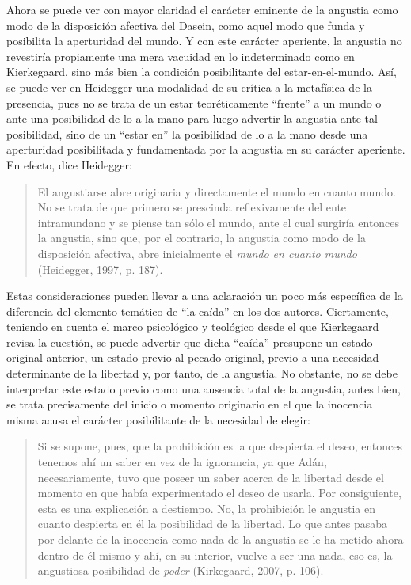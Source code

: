 \begin{refsection}
Ahora se puede ver con mayor claridad el carácter eminente de la angustia como modo de la disposición afectiva del Dasein, como aquel modo que funda y posibilita la aperturidad del mundo. Y con este carácter aperiente, la angustia no revestiría propiamente una mera vacuidad en lo indeterminado como en Kierkegaard, sino más bien la condición posibilitante del estar-en-el-mundo. Así, se puede ver en Heidegger una modalidad de su crítica a la metafísica de la presencia, pues no se trata de un estar teoréticamente ``frente'' a un mundo o ante una posibilidad de lo a la mano para luego advertir la angustia ante tal posibilidad, sino de un ``estar en'' la posibilidad de lo a la mano desde una aperturidad posibilitada y fundamentada por la angustia en su carácter aperiente. En efecto, dice Heidegger:

\begin{quote}
El angustiarse abre originaria y directamente el mundo en cuanto mundo. No se trata de que primero se prescinda reflexivamente del ente intramundano y se piense tan sólo el mundo, ante el cual surgiría entonces la angustia, sino que, por el contrario, la angustia como modo de la disposición afectiva, abre inicialmente el \emph{mundo en cuanto mundo} (Heidegger, 1997, p. 187).
\end{quote}

Estas consideraciones pueden llevar a una aclaración un poco más específica de la diferencia del elemento temático de ``la caída'' en los dos autores. Ciertamente, teniendo en cuenta el marco psicológico y teológico desde el que Kierkegaard revisa la cuestión, se puede advertir que dicha ``caída'' presupone un estado original anterior, un estado previo al pecado original, previo a una necesidad determinante de la libertad y, por tanto, de la angustia. No obstante, no se debe interpretar este estado previo como una ausencia total de la angustia, antes bien, se trata precisamente del inicio o momento originario en el que la inocencia misma acusa el carácter posibilitante de la necesidad de elegir:

\begin{quote}
Si se supone, pues, que la prohibición es la que despierta el deseo, entonces tenemos ahí un saber en vez de la ignorancia, ya que Adán, necesariamente, tuvo que poseer un saber acerca de la libertad desde el momento en que había experimentado el deseo de usarla. Por consiguiente, esta es una explicación a destiempo. No, la prohibición le angustia en cuanto despierta en él la posibilidad de la libertad. Lo que antes pasaba por delante de la inocencia como nada de la angustia se le ha metido ahora dentro de él mismo y ahí, en su interior, vuelve a ser una nada, eso es, la angustiosa posibilidad de \emph{poder} (Kirkegaard, 2007, p. 106).
\end{quote}


\end{refsection}
